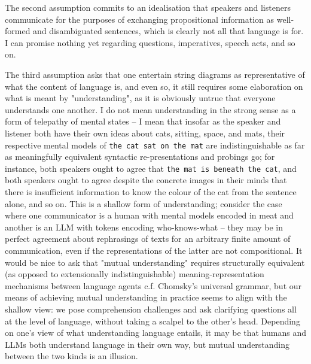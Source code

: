 \newpage


The second assumption commits to an idealisation that speakers and listeners communicate for the purposes of exchanging propositional information as well-formed and disambiguated sentences, which is clearly not all that language is for. I can promise nothing yet regarding questions, imperatives, speech acts, and so on.


The third assumption asks that one entertain string diagrams as representative of what the content of language is, and even so, it still requires some elaboration on what is meant by "understanding", as it is obviously untrue that everyone understands one another. I do not mean understanding in the strong sense as a form of telepathy of mental states -- I mean that insofar as the speaker and listener both have their own ideas about cats, sitting, space, and mats, their respective mental models of \texttt{the cat sat on the mat} are indistinguishable as far as meaningfully equivalent syntactic re-presentations and probings go; for instance, both speakers ought to agree that \texttt{the mat is beneath the cat}, and both speakers ought to agree despite the concrete images in their minds that there is insufficient information to know the colour of the cat from the sentence alone, and so on. This is a shallow form of understanding; consider the case where one communicator is a human with mental models encoded in meat and another is an LLM with tokens encoding who-knows-what -- they may be in perfect agreement about rephrasings of texts for an arbitrary finite amount of communication, even if the representations of the latter are not compositional. It would be nice to ask that "mutual understanding" requires structurally equivalent (as opposed to extensionally indistinguishable) meaning-representation mechanisms between language agents c.f. Chomsky's universal grammar, but our means of achieving mutual understanding in practice seems to align with the shallow view: we pose comprehension challenges and ask clarifying questions all at the level of language, without taking a scalpel to the other's head. Depending on one's view of what understanding language entails, it may be that humans and LLMs both understand language in their own way, but mutual understanding between the two kinds is an illusion.

\newpage
{}

